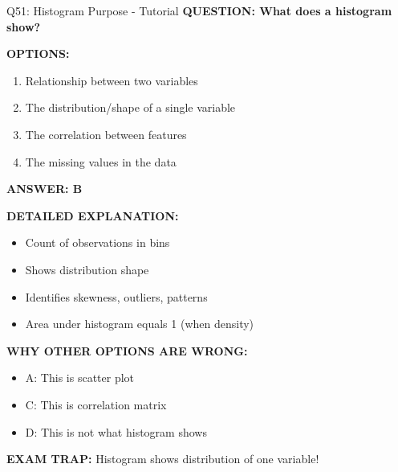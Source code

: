 \documentclass[8pt]{beamer}
\begin{document}
	\begin{frame}{Q51: Histogram Purpose - Tutorial}
		\fontsize{6.5}{7.5}\selectfont
		\textbf{QUESTION: What does a histogram show?}
		
		\vspace{0.1cm}
		\textbf{OPTIONS:}
		\begin{enumerate}
			\item Relationship between two variables
			\item The distribution/shape of a single variable
			\item The correlation between features
			\item The missing values in the data
		\end{enumerate}
		
		\vspace{0.1cm}
		\textcolor{myblue}{\textbf{ANSWER: B}}
		
		\vspace{0.1cm}
		\textbf{DETAILED EXPLANATION:}
		\begin{itemize}
			\item Count of observations in bins
			\item Shows distribution shape
			\item Identifies skewness, outliers, patterns
			\item Area under histogram equals 1 (when density)
		\end{itemize}
		
		\vspace{0.1cm}
		\textcolor{myred}{\textbf{WHY OTHER OPTIONS ARE WRONG:}}
		\begin{itemize}
			\item \textcolor{myred}{A:} This is scatter plot
			\item \textcolor{myred}{C:} This is correlation matrix
			\item \textcolor{myred}{D:} This is not what histogram shows
		\end{itemize}
		
		\textcolor{myred}{\textbf{EXAM TRAP:}} Histogram shows \textcolor{myblue}{distribution of one variable}!
	\end{frame}
	
\end{document}
